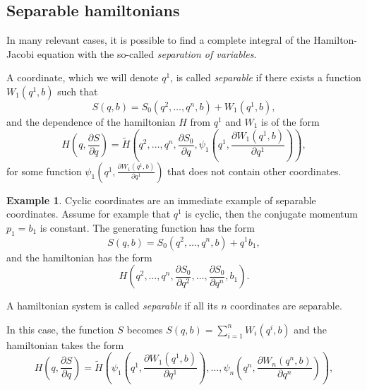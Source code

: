 \documentclass[english,fontsize=11pt,paper=b5]{scrbook}
\numberwithin{equation}{chapter}
\theoremstyle{definition}
\newtheorem{example}{Example}[chapter]
\begin{document}
    \subsection{Separable hamiltonians}\label{sec:sepsys}

    In many relevant cases, it is possible to find a complete integral of the Hamilton-Jacobi equation with the so-called \emph{separation of variables}.

    \begin{tcolorbox}
      A coordinate, which we will denote $q^1$, is called \emph{separable} if there exists a function $W_1(q^1, b)$ such that
      \begin{equation}
        S(q,b) = S_0(q^2, \ldots, q^n, b) + W_1(q^1, b),
      \end{equation}
      and the dependence of the hamiltonian $H$ from $q^1$ and $W_1$ is of the form
      \begin{equation}
        H\left(q,\frac{\partial S}{\partial q}\right) = \widetilde H\left(q^2, \ldots, q^n , \frac{\partial S_0}{\partial q}, \psi_1\left(q^1, \frac{\partial W_1(q^1, b)}{\partial q^1}\right)
        \right),
      \end{equation}
      for some function $\psi_1\left(q^1, \frac{\partial W_1(q^1, b)}{\partial q^1}\right)$ that does not contain other coordinates.
    \end{tcolorbox}

    \begin{example}
      Cyclic coordinates are an immediate example of separable coordinates.
      Assume for example that $q^1$ is cyclic, then the conjugate momentum $p_1 = b_1$ is constant.
      The generating function has the form
      \begin{equation}
        S(q,b) = S_0(q^2, \ldots, q^n, b) + q^1 b_1,
      \end{equation}
      and the hamiltonian has the form
      \begin{equation}
        H(q^2, \ldots, q^n, \frac{\partial S_0}{\partial q^2}, \ldots, \frac{\partial S_0}{\partial q^n}, b_1).
      \end{equation}
    \end{example}

    \begin{tcolorbox}
      A hamiltonian system is called \emph{separable} if all its $n$ coordinates are separable.
    \end{tcolorbox}

    In this case, the function $S$ becomes $S(q,b) = \sum_{i=1}^n W_i(q^i, b)$ and the hamiltonian takes the form
    \begin{equation}
      H\left(q,\frac{\partial S}{\partial q}\right) = \widetilde H\left(
        \psi_1\left(q^1, \frac{\partial W_1(q^1, b)}{\partial q^1}\right),
        \ldots,
        \psi_n\left(q^n, \frac{\partial W_n(q^n, b)}{\partial q^n}\right)
      \right),
    \end{equation}
\end{document}
